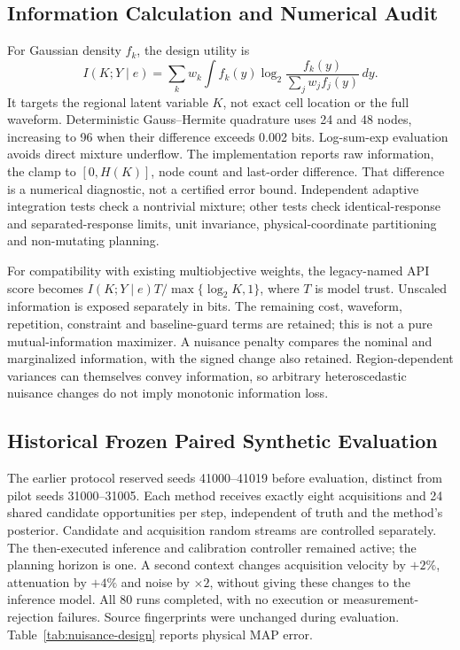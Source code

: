 \subsection{Information Calculation and Numerical Audit}
For Gaussian density $f_k$, the design utility is
\begin{equation}
 I(K;Y\mid e)=\sum_k w_k\int f_k(y)
 \log_2\!\frac{f_k(y)}{\sum_jw_j f_j(y)}\,dy.
\end{equation}
It targets the regional latent variable $K$, not exact cell location or the
full waveform. Deterministic Gauss--Hermite quadrature uses 24 and 48 nodes,
increasing to 96 when their difference exceeds 0.002 bits. Log-sum-exp
evaluation avoids direct mixture underflow. The implementation reports raw
information, the clamp to $[0,H(K)]$, node count and last-order difference.
That difference is a numerical diagnostic, not a certified error bound.
Independent adaptive integration tests check a nontrivial mixture; other tests
check identical-response and separated-response limits, unit invariance,
physical-coordinate partitioning and non-mutating planning.

For compatibility with existing multiobjective weights, the legacy-named API
score becomes $I(K;Y\mid e)T/\max\{\log_2 K,1\}$, where $T$ is model trust.
Unscaled information is exposed separately in bits. The remaining cost,
waveform, repetition, constraint and baseline-guard terms are retained; this
is not a pure mutual-information maximizer. A nuisance penalty compares the
nominal and marginalized information, with the signed change also retained.
Region-dependent variances can themselves convey information, so arbitrary
heteroscedastic nuisance changes do not imply monotonic information loss.

\subsection{Historical Frozen Paired Synthetic Evaluation}
The earlier protocol reserved seeds 41000--41019 before evaluation, distinct from
pilot seeds 31000--31005. Each method receives exactly eight acquisitions and
24 shared candidate opportunities per step, independent of truth and the
method's posterior. Candidate and acquisition random streams are controlled
separately. The then-executed inference and calibration controller remained active;
the planning horizon is one. A second context changes acquisition velocity by
$+2\%$, attenuation by $+4\%$ and noise by $\times2$, without giving these
changes to the inference model. All 80 runs completed, with no execution or
measurement-rejection failures. Source fingerprints were unchanged during
evaluation. Table~\ref{tab:nuisance-design} reports physical MAP error.

